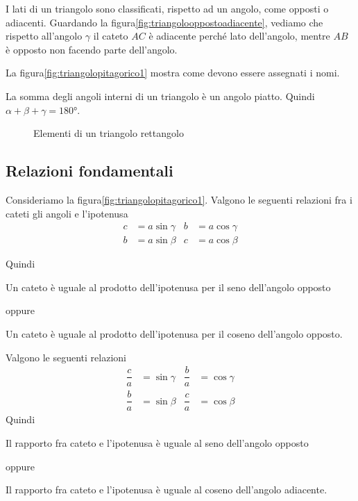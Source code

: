 I lati di un triangolo sono classificati, rispetto ad un angolo, come opposti o adiacenti. Guardando la figura\nobs\vref{fig:triangolooppostoadiacente}, vediamo che rispetto all'angolo $\gamma$ il cateto $AC$ è adiacente perché lato dell'angolo, mentre $AB$ è opposto  non facendo parte dell'angolo. 
 
 La figura\nobs\vref{fig:triangolopitagorico1} mostra come devono essere assegnati i nomi.
 
 La somma degli angoli interni di un triangolo è un angolo piatto. Quindi $\alpha+\beta+\gamma=\ang{180}$. 
\begin{figure}
	\centering
	
	\caption{Elementi di un triangolo rettangolo}
	\label{fig:triangolooppostoadiacente}
\end{figure}
\subsection{Relazioni fondamentali}
\begin{teoremat}{}{}
Consideriamo la figura\nobs\vref{fig:triangolopitagorico1}. Valgono le seguenti relazioni fra i cateti gli angoli e l'ipotenusa
\begin{align*}
c&=a\sin\gamma&b&=a\cos\gamma\\
b&=a\sin\beta&c&=a\cos\beta
\end{align*}
\end{teoremat}
Quindi

Un cateto è uguale  al prodotto dell'ipotenusa per il seno dell'angolo opposto

\noindent oppure

Un cateto è uguale al prodotto dell'ipotenusa per il coseno dell'angolo opposto.

\noindent Valgono le seguenti relazioni
\begin{align*}
\dfrac{c}{a}&=\sin\gamma&\dfrac{b}{a}&=\cos\gamma\\
\dfrac{b}{a}&=\sin\beta&\dfrac{c}{a}&=\cos\beta
\end{align*}
Quindi

Il rapporto fra  cateto e l'ipotenusa è uguale al seno dell'angolo opposto

\noindent oppure

Il rapporto fra  cateto e l'ipotenusa è uguale al coseno dell'angolo adiacente.

